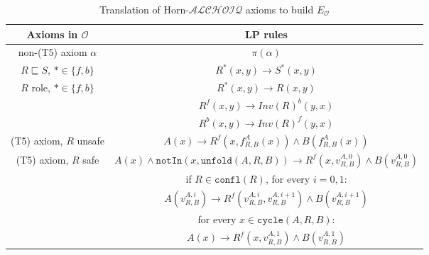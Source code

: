 \documentclass[runningheads]{llncs}
\newcommand{\alchoiq}{$\mathcal{ALCHOIQ}$\xspace}
\newcommand{\hornalchoiq}{Horn-\alchoiq\xspace}
\begin{document}
\begin{table}
    \centering
    \caption{Translation of \hornalchoiq axioms to build $E_\mathcal{O}$}
    \begin{tabular}{c | c}
        \hline
        Axioms in $\mathcal{O}$ & LP rules \\
        \hline
        non-(T5) axiom $\alpha$                     & $\pi(\alpha)$ \\
        \hline
        $R \sqsubseteq S$, $* \in \{f,b\}$          & $R^*(x,y) \rightarrow S^*(x,y)$ \\
        \hline
        \multirow{3}{*}{$R$ role, $* \in \{f,b\}$}  & $R^*(x,y) \rightarrow R(x,y)$ \\
                                                    & $R^f(x,y) \rightarrow Inv(R)^b(y,x)$ \\
                                                    & $R^b(x,y) \rightarrow Inv(R)^f(y,x)$ \\
        \hline
        (T5) axiom, $R$ unsafe                      & $A(x) \rightarrow R^f(x,f^{A}_{R,B}(x)) \land B(f^{A}_{R,B}(x))$ \\
        \hline
        \multirow{5}{*}{(T5) axiom, $R$ safe}       & $A(x) \land \texttt{notIn}(x, \texttt{unfold}(A,R,B)) \rightarrow R^f(x,v^{A,0}_{R,B}) \land B(v^{A,0}_{R,B})$ \\
                                                    \cline{2-2}
                                                    & if $R \in \texttt{confl}(R)$, for every $i = 0,1$: \\
                                                    & $A(v^{A,i}_{R,B}) \rightarrow R^f(v^{A,i}_{R,B},v^{A,i+1}_{R,B}) \land B(v^{A,i+1}_{R,B})$ \\
                                                    \cline{2-2}
                                                    & for every $x \in \texttt{cycle}(A,R,B)$: \\
                                                    & $A(x) \rightarrow R^f(x,v^{A,1}_{R,B}) \land B(v^{A,1}_{R,B})$ \\
        \hline
    \end{tabular}
    \label{table:canonical_model}
\end{table}
\end{document}
